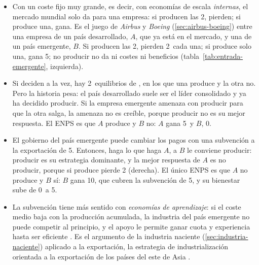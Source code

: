 \documentclass[11pt]{article}
\begin{document}
\begin{itemize}
\item Con un coste fijo muy grande, es decir, con economías de escala \emph{internas}, el mercado mundial solo da para una empresa: si producen las 2, pierden; si produce una, gana. Es el juego de \emph{Airbus} y \emph{Boeing} (\ref{sec:airbus-boeing}) entre una empresa de un país desarrollado, $A$, que ya está en el mercado, y una de un país emergente, $B$. Si producen las 2, pierden 2~cada una; si produce solo una, gana 5; no producir no da ni costes ni beneficios (tabla~\ref{tab:entrada-emergente}, izquierda).
\item Si deciden a la vez, hay 2~equilibrios de , en los que una produce y la otra no. Pero la historia pesa: el país desarrollado suele ser el líder consolidado y ya ha decidido producir. Si la empresa emergente amenaza con producir para que la otra salga, la amenaza no es creíble, porque producir no es su mejor respuesta. El ENPS es que $A$ produce y $B$ no: $A$ gana 5~y $B$, 0.
\item El gobierno del país emergente puede cambiar los pagos con una subvención a la exportación de 5. Entonces, haga lo que haga $A$, a $B$ le conviene producir: producir es su estrategia dominante, y la mejor respuesta de $A$ es no producir, porque si produce pierde 2 (derecha). El único ENPS es que $A$ no produce y $B$ sí: $B$ gana 10, que cubren la subvención de 5, y su bienestar sube de 0~a 5.\findemo
\item La subvención tiene más sentido con \emph{economías de aprendizaje}: si el coste medio baja con la producción acumulada, la industria del país emergente no puede competir al principio, y el apoyo le permite ganar cuota y experiencia hasta ser eficiente . Es el argumento de la industria naciente (\ref{sec:industria-naciente}) aplicado a la exportación, la estrategia de industrialización orientada a la exportación de los países del este de Asia .
\end{itemize}
\end{document}
